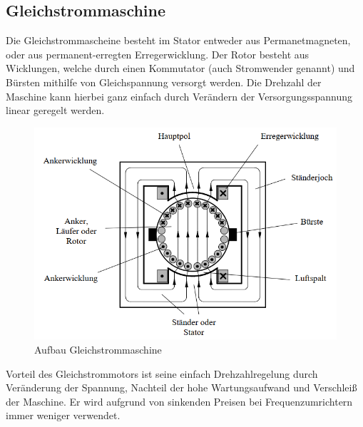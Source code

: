 \subsection{Gleichstrommaschine}
	Die Gleichstrommascheine besteht im Stator entweder aus Permanetmagneten, oder aus permanent-erregten Erregerwicklung. Der Rotor besteht aus Wicklungen, welche durch einen Kommutator (auch Stromwender genannt) und Bürsten mithilfe von Gleichspannung versorgt werden. Die Drehzahl der Maschine kann hierbei ganz einfach durch Verändern der Versorgungsspannung linear geregelt werden. 
	
	\begin{figure}[H]
			\centering
			\includegraphics[scale=0.8]{./3_Stand_der_Technik/Abbildungen/Gleichstrommaschine_1}
			\caption{Aufbau Gleichstrommaschine\cite{Pischtschan2024}}
	\end{figure}
	
	Vorteil des Gleichstrommotors ist seine einfach Drehzahlregelung durch Veränderung der Spannung, Nachteil der hohe Wartungsaufwand und Verschleiß der Maschine. Er wird aufgrund von sinkenden Preisen bei Frequenzumrichtern immer weniger verwendet.